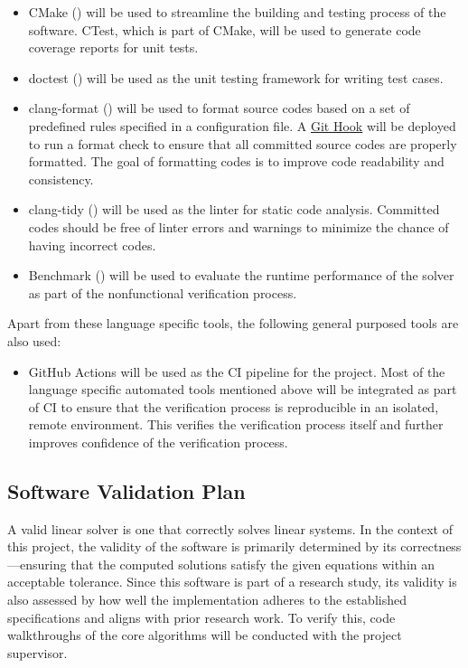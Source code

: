 \documentclass[12pt, titlepage]{article}
\begin{document}
\begin{itemize}
\item CMake (\cite{noauthor_cmake_nodate}) will be used to streamline the building and
  testing process of the software. CTest, which is part of CMake, will be used
  to generate code coverage reports for unit tests.
\item doctest (\cite{noauthor_doctestdoctest_2025}) will be used as the unit testing
  framework for writing test cases.
\item clang-format (\cite{noauthor_clangformat_nodate}) will be used to format source
  codes based on a set of predefined rules specified in a configuration file. A
  \href{https://git-scm.com/book/ms/v2/Customizing-Git-Git-Hooks}{Git Hook} will
  be deployed to run a format check to ensure that all committed source codes
  are properly formatted. The goal of formatting codes is to improve code
  readability and consistency.
\item clang-tidy (\cite{noauthor_clang-tidy_nodate}) will be used as the linter for
  static code analysis. Committed codes should be free of linter errors and
  warnings to minimize the chance of having incorrect codes.
\item Benchmark (\cite{noauthor_googlebenchmark_2025}) will be used to evaluate the
  runtime performance of the solver as part of the nonfunctional verification
  process.
\end{itemize}

Apart from these language specific tools, the following general purposed tools
are also used:

\begin{itemize}
\item GitHub Actions will be used as the CI pipeline for the project. Most of the
  language specific automated tools mentioned above will be integrated as part
  of CI to ensure that the verification process is reproducible in an isolated,
  remote environment. This verifies the verification process itself and further
  improves confidence of the verification process.
\end{itemize}

\subsection{Software Validation Plan}

A valid linear solver is one that correctly solves linear systems. In the
context of this project, the validity of the software is primarily determined by
its correctness---ensuring that the computed solutions satisfy the given
equations within an acceptable tolerance. Since this software is part of a
research study, its validity is also assessed by how well the implementation
adheres to the established specifications and aligns with prior research work.
To verify this, code walkthroughs of the core algorithms will be conducted with
the project supervisor.
\end{document}
